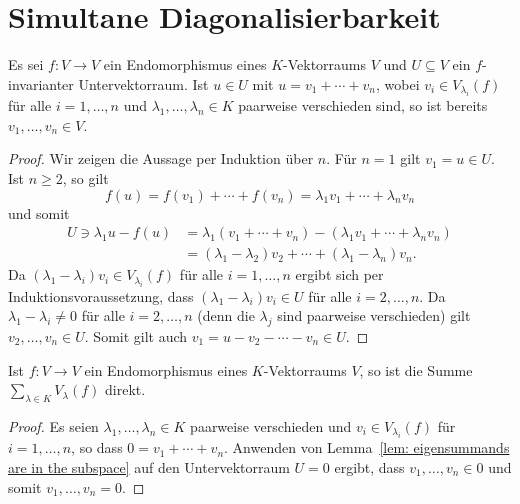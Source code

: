 \section{Simultane Diagonalisierbarkeit}


\begin{lemma}\label{lem: eigensummands are in the subspace}
  Es sei $f \colon V \to V$ ein Endomorphismus eines $K$-Vektorraums $V$ und \mbox{$U \subseteq V$} ein $f$-invarianter Untervektorraum.
  Ist $u \in U$ mit $u = v_1 + \dotsb + v_n$, wobei $v_i \in V_{\lambda_i}(f)$ für alle $i = 1, \dotsc, n$ und $\lambda_1, \dotsc, \lambda_n \in K$ paarweise verschieden sind, so ist bereits $v_1, \dotsc, v_n \in V$.
\end{lemma}


\begin{proof}
  Wir zeigen die Aussage per Induktion über $n$.
  Für $n = 1$ gilt $v_1 = u \in U$.
  Ist $n \geq 2$, so gilt
  \[
      f(u)
    = f(v_1) + \dotsb + f(v_n)
    =  \lambda_1 v_1 + \dotsb + \lambda_n v_n
  \]
  und somit
  \begin{align*}
    U \ni \lambda_1 u - f(u)
      &=  \lambda_1 (v_1 + \dotsb + v_n) - (\lambda_1 v_1 + \dotsb + \lambda_n v_n) \\
      &=  (\lambda_1 - \lambda_2) v_2 + \dotsb + (\lambda_1 - \lambda_n) v_n.
  \end{align*}
  Da $(\lambda_1 - \lambda_i) v_i \in V_{\lambda_i}(f)$ für alle $i = 1, \dotsc, n$ ergibt sich per Induktionsvoraussetzung, dass $(\lambda_1 - \lambda_i) v_i \in U$ für alle $i = 2, \dotsc, n$.
  Da $\lambda_1 - \lambda_i \neq 0$ für alle $i = 2, \dotsc, n$ (denn die $\lambda_j$ sind paarweise verschieden) gilt $v_2, \dotsc, v_n \in U$.
  Somit gilt auch \mbox{$v_1 = u - v_2 - \dotsb - v_n \in U$}.
\end{proof}


\begin{lemma}\label{lem: directness of sum of eigenspaces}
  Ist $f \colon V \to V$ ein Endomorphismus eines $K$-Vektorraums $V$, so ist die Summe $\sum_{\lambda \in K} V_\lambda(f)$ direkt.
\end{lemma}


\begin{proof}
  Es seien $\lambda_1, \dotsc, \lambda_n \in K$ paarweise verschieden und $v_i \in V_{\lambda_i}(f)$ für $i = 1, \dotsc, n$, so dass $0 = v_1 + \dotsb + v_n$.
  Anwenden von Lemma~\ref{lem: eigensummands are in the subspace} auf den Untervektorraum $U = 0$ ergibt, dass $v_1, \dotsc, v_n \in 0$ und somit $v_1, \dotsc, v_n = 0$.
\end{proof}


